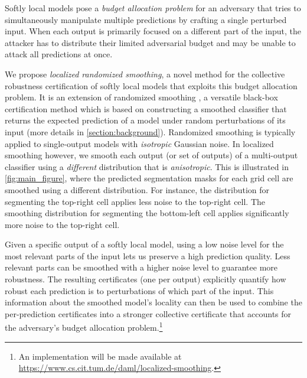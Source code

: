 \documentclass{article} %
\theoremstyle{plain}
\theoremstyle{definition}
\theoremstyle{remark}
\begin{document}
Softly local models pose a \textit{budget allocation problem} for
an adversary that tries to simultaneously manipulate multiple predictions by crafting a single perturbed input.
When each output is primarily focused on a different part of the input, the attacker has to distribute their limited adversarial budget and may be unable to attack all predictions at once.

We propose \textit{localized randomized smoothing}, a novel method for the collective robustness certification of softly local models that exploits this budget allocation problem.
It is an extension of randomized smoothing \citep{Lecuyer2019,Li2019,Cohen2019}, a versatile black-box certification method which is based on constructing a smoothed classifier that returns the expected prediction of a model under random perturbations of its input (more details in \autoref{section:background}).
Randomized smoothing is typically applied to single-output models with \textit{isotropic} Gaussian noise.
In localized smoothing however, we smooth each output (or set of outputs) of a multi-output classifier using a \textit{different}
distribution that is \textit{anisotropic}.
This is illustrated in \autoref{fig:main_figure}, where the predicted segmentation masks for each grid cell are smoothed using a different distribution.
For instance, the distribution for segmenting the top-right cell applies less noise to the top-right cell.
The smoothing distribution for segmenting the bottom-left cell applies significantly more noise to the top-right cell.

Given a specific output of a softly local model, using a low noise level for the most relevant parts of the input lets us preserve a high prediction quality. 
Less relevant parts can be smoothed with a higher noise level to guarantee more robustness.
The resulting certificates (one per output) explicitly quantify how robust each prediction is to perturbations of which part of the input.
This information about the smoothed model's locality can then be used to combine the per-prediction certificates into a stronger collective certificate that accounts for the adversary's budget allocation problem.\footnote{An implementation will be made available at 
\href{https://www.cs.cit.tum.de/daml/localized-smoothing/}{https://www.cs.cit.tum.de/daml/localized-smoothing}.}
\end{document}
